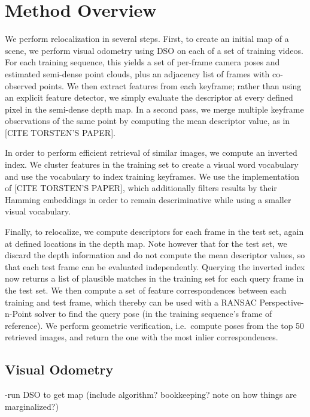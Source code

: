 \chapter{Method Overview}



We perform relocalization in several steps. First, to create an initial map of a scene, we perform visual odometry using DSO on each of a set of training videos. For each training sequence, this yields a set of per-frame camera poses and estimated semi-dense point clouds, plus an adjacency list of frames with co-observed points. We then extract features from each keyframe; rather than using an explicit feature detector, we simply evaluate the descriptor at every defined pixel in the semi-dense depth map. In a second pass, we merge multiple keyframe observations of the same point by computing the mean descriptor value, as in [CITE TORSTEN'S PAPER].

In order to perform efficient retrieval of similar images, we compute an inverted index. We cluster features in the training set to create a visual word vocabulary and use the vocabulary to index training keyframes. We use the implementation of [CITE TORSTEN'S PAPER], which additionally filters results by their Hamming embeddings in order to remain descriminative while using a smaller visual vocabulary.

Finally, to relocalize, we compute descriptors for each frame in the test set, again at defined locations in the depth map. Note however that for the test set, we discard the depth information and do not compute the mean descriptor values, so that each test frame can be evaluated independently. Querying the inverted index now returns a list of plausible matches in the training set for each query frame in the test set. We then compute a set of feature correspondences between each training and test frame, which thereby can be used with a RANSAC Perspective-n-Point solver to find the query pose (in the training sequence's frame of reference). We perform geometric verification, i.e.\ compute poses from the top 50 retrieved images, and return the one with the most inlier correspondences.

\section{Visual Odometry}
-run DSO to get map (include algorithm? bookkeeping? note on how things are marginalized?)

